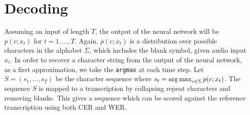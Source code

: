 \section{Decoding}
\label{sec:first_pass:decoding}

Assuming an input of length $T$, the output of the neural network will be $p(c;
x_t)$ for $t = 1,\ldots,T$. Again, $p(c; x_t)$ is a distribution over possible
characters in the alphabet $\Sigma$, which includes the blank symbol, given
audio input $x_t$. In order to recover a character string from the output of
the neural network, as a first approximation, we take the \texttt{argmax} at
each time step. Let $S = (s_1,\ldots,s_T)$ be the character sequence where $s_t
= \operatorname*{arg\,max}_{c \in \Sigma} p(c; x_t)$. The sequence $S$ is mapped to a
transcription by collapsing repeat characters and removing blanks. This gives a
sequence which can be scored against the reference transcription using both CER
and WER.

